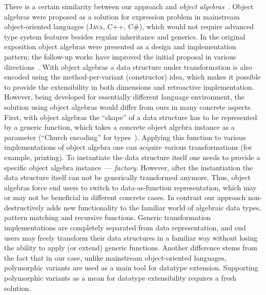 There is a certain similarity between our approach and \emph{object algebras}~\cite{ObjectAlgebras}. Object algebras were proposed as a solution
for expression problem in mainstream object-oriented languages (\textsc{Java}, \textsc{C++}, \textsc{C\#}), which would not require advanced type system features besides
regular inheritance and generics. In the original exposition object algebras were presented as a design and implementation pattern; the follow-up
works have improved the initial proposal in various directions~\cite{ObjectAlgebrasAttribute,ObjectAlgebrasSYB}.
With object algebras a data structure under transformation is also encoded using the method-per-variant (constructor) idea, which makes it possible to
provide the extensibility in both dimensions and retroactive implementation. However, being developed for essentially different language environment,
the solution using object algebras would differ from ours in many concrete aspects. First, with object algebras the ``shape'' of a data structure has to
be represented by a generic function, which takes a concrete object algebra instance as a parameter (``Church encoding'' for types~\cite{Hinze}). Applying
this function to various implementations of object algebra one can acquire various transformations (for example, printing). To instantiate the data
structure itself one needs to provide a specific object algebra instance~--- \emph{factory}. However, after the instantiation the data structure itself
can not be generically transformed anymore. Thus, object algebras force end users to switch to data-as-function representation, which may or may not be
beneficial in different concrete cases. In contrast our approach non-destructively adds new functionality to the familiar world of algebraic data types,
pattern matching and recursive functions. Generic transformation implementations are completely separated from data representation, and end users may
freely transform their data structures in a familiar way without losing the ability to apply (or extend) generic functions. Another difference stems
from the fact that in our case, unlike mainstream object-oriented languages, polymorphic variants are used as a main tool for datatype extension.
Supporting polymorphic variants as a mean for datatype extensibility requires a fresh solution.

